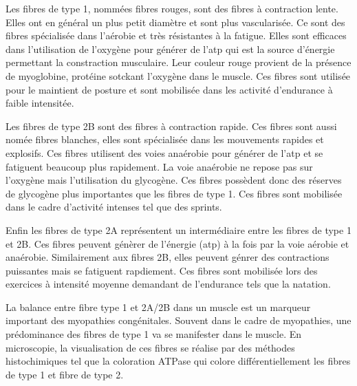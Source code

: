 Les fibres de type 1, nommées fibres rouges, sont des fibres à contraction lente. Elles ont en général un plus petit diamètre et sont plus vascularisée. Ce sont des fibres spécialisée dans l'aérobie et très résistantes à la fatigue. Elles sont efficaces dans l'utilisation de l'oxygène pour générer de l'\gls{atp} qui est la source d'énergie permettant la constraction musculaire. Leur couleur rouge provient de la présence de myoglobine, protéine sotckant l'oxygène dans le muscle. Ces fibres sont utilisée pour le maintient de posture et sont mobilisée dans les activité d'endurance à faible intensitée.


Les fibres de type 2B sont des fibres à contraction rapide. Ces fibres sont aussi nomée fibres blanches, elles sont spécialisée dans les mouvements rapides et explosifs. Ces fibres utilisent des voies anaérobie pour générer de l'\gls{atp} et se fatiguent beaucoup plus rapidement. La voie anaérobie ne repose pas sur l'oxygène mais l'utilisation du glycogène. Ces fibres possèdent donc des réserves de glycogène plus importantes que les fibres de type 1. Ces fibres sont mobilisée dans le cadre d'activité intenses tel que des sprints.


Enfin les fibres de type 2A représentent un intermédiaire entre les fibres de type 1 et 2B.  Ces fibres peuvent génèrer de l'énergie (\gls{atp}) à la fois par la voie aérobie et anaérobie. Similairement aux fibres 2B, elles peuvent génrer des contractions puissantes mais se fatiguent rapdiement. Ces fibres sont mobilisée lors des exercices à intensité moyenne demandant de l'endurance tels que la natation.


La balance entre fibre type 1 et 2A/2B dans un muscle est un marqueur important des myopathies congénitales. Souvent dans le cadre de myopathies, une prédominance des fibres de type 1 va se manifester dans le muscle. En microscopie, la visualisation de ces fibres se réalise par des méthodes histochimiques tel que la coloration ATPase qui colore différentiellement les fibres de type 1 et fibre de type 2. 

